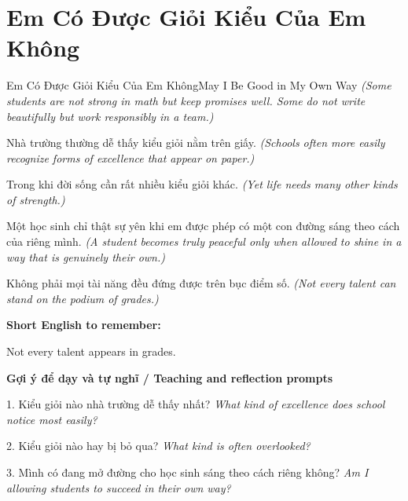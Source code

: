\section{Em Có Được Giỏi Kiểu Của Em Không}
\begin{truyen}{Em Có Được Giỏi Kiểu Của Em Không}{May I Be Good in My Own Way}
\textit{(Some students are not strong in math but keep promises well. Some do not write beautifully but work responsibly in a team.)}

Nhà trường thường dễ thấy kiểu giỏi nằm trên giấy.
\textit{(Schools often more easily recognize forms of excellence that appear on paper.)}

Trong khi đời sống cần rất nhiều kiểu giỏi khác.
\textit{(Yet life needs many other kinds of strength.)}

Một học sinh chỉ thật sự yên khi em được phép có một con đường sáng theo cách của riêng mình.
\textit{(A student becomes truly peaceful only when allowed to shine in a way that is genuinely their own.)}

\end{truyen}

\begin{baihoc}
Không phải mọi tài năng đều đứng được trên bục điểm số.
\textit{(Not every talent can stand on the podium of grades.)}
\end{baihoc}

\begin{ghinhoanh}
\textbf{Short English to remember:}

Not every talent appears in grades.

\end{ghinhoanh}

\begin{tuhocnhanh}
\textbf{Gợi ý để dạy và tự nghĩ / Teaching and reflection prompts}

1. Kiểu giỏi nào nhà trường dễ thấy nhất? \textit{What kind of excellence does school notice most easily?}

2. Kiểu giỏi nào hay bị bỏ qua? \textit{What kind is often overlooked?}

3. Mình có đang mở đường cho học sinh sáng theo cách riêng không? \textit{Am I allowing students to succeed in their own way?}
\end{tuhocnhanh}
\ngancach

